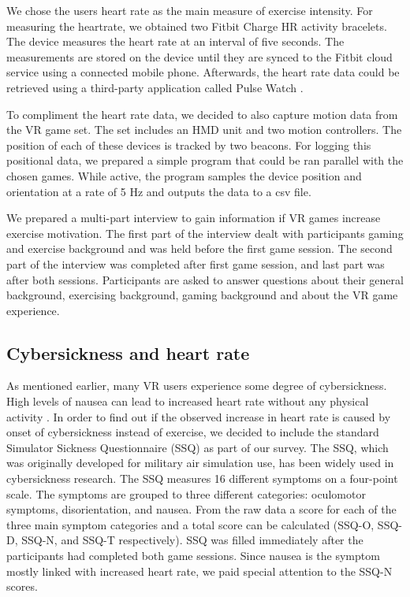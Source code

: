 \documentclass{sig-alternate-05-2015}
\begin{document}
We chose the users heart rate as the main measure of exercise intensity. For measuring the 
heartrate, we obtained two Fitbit Charge HR activity bracelets. The device measures the 
heart rate at an interval of five seconds. The measurements are stored on the device until 
they are synced to the Fitbit cloud service using a connected mobile phone. Afterwards, 
the heart rate data could be retrieved using a third-party application called Pulse Watch 
\cite{pulsewatch}. 

To compliment the heart rate data, we decided to also capture motion data from the VR 
game set. The set includes an HMD unit and two motion controllers. The position of each 
of these devices is tracked by two beacons. For logging this positional data, we 
prepared a simple program that could be ran parallel with the chosen games. While active, 
the program samples the device position and orientation at a rate of 5 Hz and outputs the 
data to a csv file. 

We prepared a multi-part interview to gain information if VR games increase exercise motivation. 
The first part of the interview dealt with participants gaming and exercise background and 
was held before the first game session. The second part of the interview was completed after 
first game session, and last part was after both sessions. Participants are asked to answer 
questions about their general background, exercising background, gaming background and about 
the VR game experience. 

\subsection{Cybersickness and heart rate}
As mentioned earlier, many VR users experience some degree of cybersickness. High levels 
of nausea can lead to increased heart rate without any physical activity \cite{nalivaiko2015cybersickness}. 
In order to find out if the observed increase in heart rate is caused by onset of cybersickness 
instead of exercise, we decided to include the standard Simulator Sickness Questionnaire 
(SSQ) \cite{kennedy1993simulator} as part of our survey. The SSQ, which was originally 
developed for military air simulation use, has been widely used in cybersickness research. 
The SSQ measures 16 different symptoms on a four-point scale. The symptoms are grouped to 
three different categories: oculomotor symptoms, disorientation, and nausea. From the raw 
data a score for each of the three main symptom categories and a total score can be calculated 
(SSQ-O, SSQ-D, SSQ-N, and SSQ-T respectively). SSQ was filled immediately after the participants 
had completed both game sessions.  Since nausea is the symptom mostly linked with increased 
heart rate, we paid special attention to the SSQ-N scores.
\end{document}
